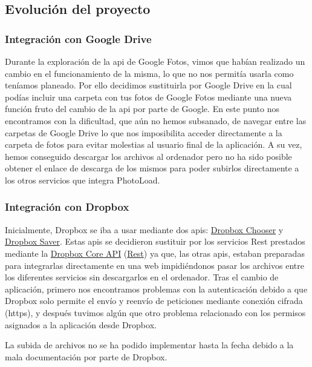 \documentclass{scrartcl}
\begin{document}
\subsection{Evolución del proyecto}\label{cap:problemas encontrados}
\subsubsection{Integración con Google Drive}
Durante la exploración de la api de Google Fotos, vimos que habían realizado un cambio en el funcionamiento de la misma, lo que no nos permitía usarla como teníamos planeado. Por ello decidimos sustituirla por Google Drive en la cual podías incluir una carpeta con tus fotos de Google Fotos mediante una nueva función fruto del cambio de la api por parte de Google. En este punto nos encontramos con la dificultad, que aún no hemos subsanado, de navegar entre las carpetas de Google Drive lo que nos imposibilita acceder directamente a la carpeta de fotos para evitar molestias al usuario final de la aplicación. A su vez, hemos conseguido descargar los archivos al ordenador pero no ha sido posible obtener el enlace de descarga de los mismos para poder subirlos directamente a los otros servicios que integra PhotoLoad.
\subsubsection{Integración con Dropbox}
Inicialmente, Dropbox se iba a usar mediante dos apis: \href{https://www.dropbox.com/developers/dropins/chooser/js}{Dropbox Chooser} y \href{https://www.dropbox.com/developers/dropins/saver}{Dropbox Saver}. Estas apis se decidieron sustituir por los servicios Rest prestados mediante la \href{https://www.dropbox.com/developers/core}{Dropbox Core API} (\href{https://www.dropbox.com/developers/core/docs}{Rest}) ya que, las otras apis, estaban preparadas para integrarlas directamente en una web impidiéndonos pasar los archivos entre los diferentes servicios sin descargarlos en el ordenador. Tras el cambio de aplicación, primero nos encontramos problemas con la autenticación debido a que Dropbox solo permite el envío y reenvío de peticiones mediante conexión cifrada (https), y después tuvimos algún que otro problema relacionado con los permisos asignados a la aplicación desde Dropbox.

La subida de archivos no se ha podido implementar hasta la fecha debido a la mala documentación por parte de Dropbox.
\end{document}
